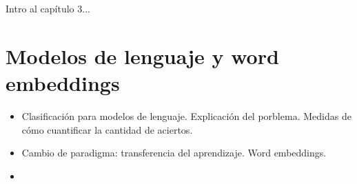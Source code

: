 
Intro al capítulo 3...

\section{Modelos de lenguaje y word embeddings}

\begin{itemize}
    \item Clasificación para modelos de lenguaje. Explicación del porblema. Medidas de cómo cuantificar la cantidad de aciertos.
    \item Cambio de paradigma: transferencia del aprendizaje. Word embeddings.
    \item 
\end{itemize}
